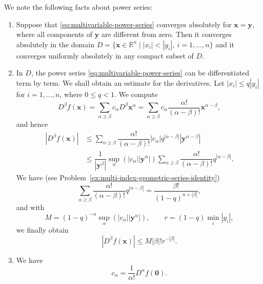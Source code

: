 We note the following facts about power series:
\begin{enumerate}
\item Suppose that \eqref{eq:multivariable-power-series} converges absolutely for $\bm{x}=\bm{y}$, where all components of $\bm{y}$ are different from zero. Then it converges absolutely in the domain $D=\{\bm{x}\in\mathbb{R}^n\mid |x_i|<|y_i|,\ i=1,\ldots,n\}$ and it converges uniformly absolutely in any compact subset of $D$.
\item In $D$, the power series \eqref{eq:multivariable-power-series} can be differentiated term by term. We shall obtain an estimate for the derivatives. Let $|x_i|\leq q|y_i|$ for $i=1,\ldots,n$, where $0\leq q<1$. We compute
\begin{equation}\label{eq:power-series-termwise-derivative}
D^\beta f(\bm{x})=\sum_{\alpha\geq\beta}c_\alpha D^\beta\bm{x}^{\alpha}=\sum_{\alpha\geq\beta}c_\alpha\dfrac{\alpha!}{(\alpha-\beta)!}\bm{x}^{\alpha-\beta},
\end{equation}
and hence
\[
\begin{aligned}
|D^\beta f(\bm{x})|
&\leq\sum_{\alpha\geq\beta}\dfrac{\alpha!}{(\alpha-\beta)!}|c_\alpha|q^{|\alpha-\beta|}|\bm{y}^{\alpha-\beta}|\\
&\leq\dfrac1{|\bm{y}^{\beta}|}\sup_\alpha(|c_\alpha||\bm{y}^{\alpha}|)
\sum_{\alpha\geq\beta}\dfrac{\alpha!}{(\alpha-\beta)!}q^{|\alpha-\beta|}.
\end{aligned}
\]
We have (see Problem~\ref{ex:multi-index-geometric-series-identity})
\begin{equation}\label{eq:multi-index-geometric-derivative-sum}
\sum_{\alpha\geq\beta}\dfrac{\alpha!}{(\alpha-\beta)!}q^{|\alpha-\beta|}=\dfrac{\beta!}{(1-q)^{n+|\beta|}},
\end{equation}
and with
\begin{equation}\label{eq:power-series-derivative-bound-constants}
M=(1-q)^{-n}\sup_\alpha(|c_\alpha||\bm{y}^{\alpha}|),\qquad r=(1-q)\min_i|y_i|,
\end{equation}
we finally obtain
\begin{equation}\label{eq:power-series-factorial-derivative-bound}
|D^\beta f(\bm{x})|\leq M|\beta|!r^{-|\beta|}.
\end{equation}
\item We have
\begin{equation}\label{eq:power-series-taylor-coefficients}
c_\alpha=\dfrac1{\alpha!}D^\alpha f(\bm{0}).
\end{equation}
\end{enumerate}

